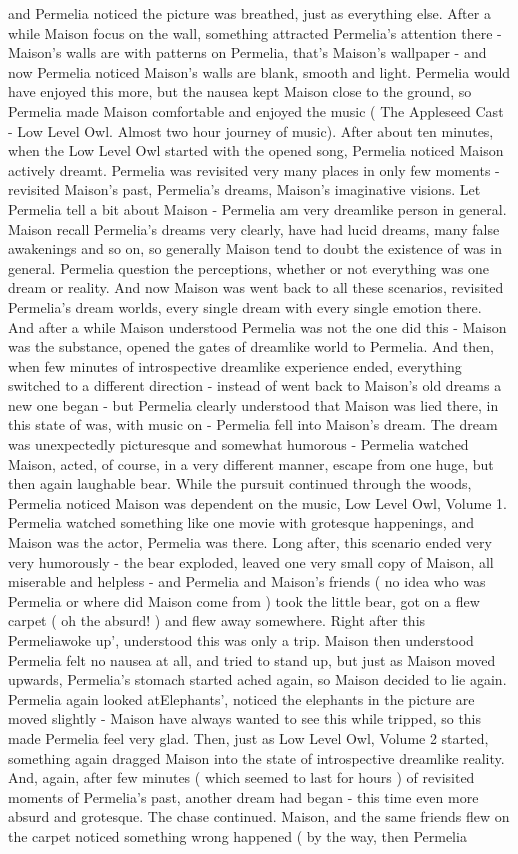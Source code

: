 \documentclass[12pt]{book}
\begin{document}
and Permelia noticed the picture was breathed, just as everything else. After a while Maison focus on the wall, something attracted Permelia's attention there - Maison's walls are with patterns on Permelia, that's Maison's wallpaper - and now Permelia noticed Maison's walls are blank, smooth and light. Permelia would have enjoyed this more, but the nausea kept Maison close to the ground, so Permelia made Maison comfortable and enjoyed the music ( The Appleseed Cast - Low Level Owl. Almost two hour journey of music). After about ten minutes, when the Low Level Owl started with the opened song, Permelia noticed Maison actively dreamt. Permelia was revisited very many places in only few moments - revisited Maison's past, Permelia's dreams, Maison's imaginative visions. Let Permelia tell a bit about Maison - Permelia am very dreamlike person in general. Maison recall Permelia's dreams very clearly, have had lucid dreams, many false awakenings and so on, so generally Maison tend to doubt the existence of was in general. Permelia question the perceptions, whether or not everything was one dream or reality. And now Maison was went back to all these scenarios, revisited Permelia's dream worlds, every single dream with every single emotion there. And after a while Maison understood Permelia was not the one did this - Maison was the substance, opened the gates of dreamlike world to Permelia. And then, when few minutes of introspective dreamlike experience ended, everything switched to a different direction - instead of went back to Maison's old dreams a new one began - but Permelia clearly understood that Maison was lied there, in this state of was, with music on - Permelia fell into Maison's dream. The dream was unexpectedly picturesque and somewhat humorous - Permelia watched Maison, acted, of course, in a very different manner, escape from one huge, but then again laughable bear. While the pursuit continued through the woods, Permelia noticed Maison was dependent on the music, Low Level Owl, Volume 1. Permelia watched something like one movie with grotesque happenings, and Maison was the actor, Permelia was there. Long after, this scenario ended very very humorously - the bear exploded, leaved one very small copy of Maison, all miserable and helpless - and Permelia and Maison's friends ( no idea who was Permelia or where did Maison come from ) took the little bear, got on a flew carpet ( oh the absurd! ) and flew away somewhere. Right after this Permeliawoke up', understood this was only a trip. Maison then understood Permelia felt no nausea at all, and tried to stand up, but just as Maison moved upwards, Permelia's stomach started ached again, so Maison decided to lie again. Permelia again looked atElephants', noticed the elephants in the picture are moved slightly - Maison have always wanted to see this while tripped, so this made Permelia feel very glad. Then, just as Low Level Owl, Volume 2 started, something again dragged Maison into the state of introspective dreamlike reality. And, again, after few minutes ( which seemed to last for hours ) of revisited moments of Permelia's past, another dream had began - this time even more absurd and grotesque. The chase continued. Maison, and the same friends flew on the carpet noticed something wrong happened ( by the way, then Permelia 
\end{document}
